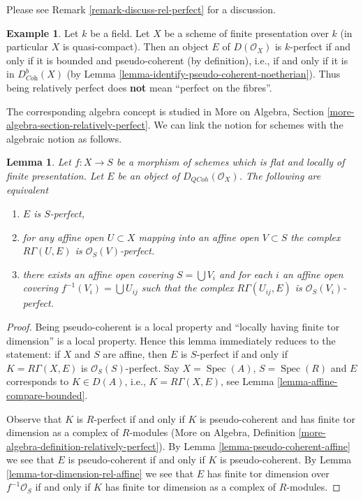 \documentclass{stacks-project}
\theoremstyle{plain}
\newtheorem{lemma}[subsection]{Lemma}
\theoremstyle{definition}
\newtheorem{example}[subsection]{Example}
\theoremstyle{remark}
\numberwithin{equation}{subsection}
\def\Spec{\mathop{\mathrm{Spec}}}
\def\QCoh{\mathit{QCoh}}
\begin{document}
\noindent
Please see Remark \ref{remark-discuss-rel-perfect} for a discussion.

\begin{example}
\label{example-relatively-perfect-field}
Let $k$ be a field. Let $X$ be a scheme of finite presentation over $k$
(in particular $X$ is quasi-compact). Then an object $E$ of $D(\mathcal{O}_X)$
is $k$-perfect if and only if it is bounded and pseudo-coherent
(by definition), i.e., if and only if it is in $D^b_{\textit{Coh}}(X)$
(by Lemma \ref{lemma-identify-pseudo-coherent-noetherian}).
Thus being relatively perfect does {\bf not} mean ``perfect on the fibres''.
\end{example}

\noindent
The corresponding algebra concept is studied in
More on Algebra, Section \ref{more-algebra-section-relatively-perfect}.
We can link the notion for schemes with the algebraic notion
as follows.

\begin{lemma}
\label{lemma-affine-locally-rel-perfect}
Let $f : X \to S$ be a morphism of schemes which is flat and
locally of finite presentation. Let $E$ be an object of
$D_\QCoh(\mathcal{O}_X)$. The following are equivalent
\begin{enumerate}
\item $E$ is $S$-perfect,
\item for any affine open $U \subset X$ mapping into an affine open
$V \subset S$ the complex $R\Gamma(U, E)$ is $\mathcal{O}_S(V)$-perfect.
\item there exists an affine open covering $S = \bigcup V_i$
and for each $i$ an affine open covering $f^{-1}(V_i) = \bigcup U_{ij}$
such that the complex $R\Gamma(U_{ij}, E)$ is $\mathcal{O}_S(V_i)$-perfect.
\end{enumerate}
\end{lemma}

\begin{proof}
Being pseudo-coherent is a local property and
``locally having finite tor dimension'' is a local property.
Hence this lemma immediately reduces to the statement:
if $X$ and $S$ are affine, then $E$ is $S$-perfect
if and only if $K = R\Gamma(X, E)$ is $\mathcal{O}_S(S)$-perfect.
Say $X = \Spec(A)$, $S = \Spec(R)$ and $E$ corresponds to
$K \in D(A)$, i.e., $K = R\Gamma(X, E)$, see
Lemma \ref{lemma-affine-compare-bounded}.

\medskip\noindent
Observe that $K$ is $R$-perfect if and only if $K$ is
pseudo-coherent and has finite tor dimension as a complex
of $R$-modules (More on Algebra, Definition
\ref{more-algebra-definition-relatively-perfect}).
By Lemma \ref{lemma-pseudo-coherent-affine}
we see that $E$ is pseudo-coherent if and only if
$K$ is pseudo-coherent.
By Lemma \ref{lemma-tor-dimension-rel-affine} we see that
$E$ has finite tor dimension over $f^{-1}\mathcal{O}_S$
if and only if $K$ has finite tor dimension as a complex of
$R$-modules.
\end{proof}
\end{document}
